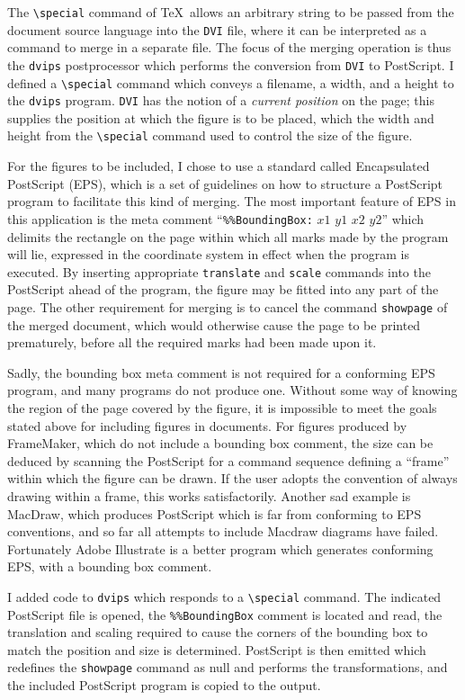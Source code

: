The \verb|\special| command of \TeX\
allows an arbitrary string to be passed from the
document source language into the {\tt DVI} file,
where it can be interpreted as a command to merge in a separate file.
The focus of the merging operation is thus the {\tt dvips} postprocessor
which performs the conversion from {\tt DVI} to PostScript.
I defined a \verb|\special| command
which conveys a filename, a width, and a height to the {\tt dvips}
program.
{\tt DVI} has the notion of a {\em current position}
on the page; this supplies the position at which the figure is to
be placed, which the width and height from the
\verb|\special|
command used to control the size of the figure.

For the figures to be included,
I chose to use a standard called Encapsulated PostScript (EPS),
which is a set of guidelines on how to structure a PostScript
program to facilitate this kind of merging.
The most important feature of EPS in this application
is the meta comment
``\verb|%%BoundingBox:| $x1$ $y1$ $x2$ $y2$''
which delimits the rectangle on the page within which all marks
made by the program will lie,
expressed in the coordinate system in effect when the program
is executed.
By inserting appropriate {\tt translate} and {\tt scale} commands
into the PostScript ahead of the program,
the figure may be fitted into any part of the page.
The other requirement for merging is to cancel the
command {\tt showpage} of the merged document,
which would otherwise cause the page to be printed
prematurely,
before all the required marks had been made upon it.

Sadly, the bounding box meta comment is not required for a conforming
EPS program, and many programs do not produce one.
Without some way of knowing the region of the page covered by
the figure, it is impossible to meet the goals stated above
for including figures in documents.
For figures produced by FrameMaker,
which do not include a bounding box comment,
the size can be deduced by scanning the PostScript
for a command sequence defining a ``frame'' within which the
figure can be drawn.
If the user adopts the convention of always drawing within a frame,
this works satisfactorily.
Another sad example is MacDraw,
which produces PostScript which is far from conforming to EPS conventions,
and so far all attempts to include Macdraw diagrams have failed.
Fortunately Adobe Illustrate is a better program which generates
conforming EPS, with a bounding box comment.

I added code to {\tt dvips} which responds to a
\verb|\special|
command.
The indicated PostScript file is opened,
the
\verb|%%BoundingBox|
comment is located and read,
the translation and scaling required to cause
the corners of the bounding box to match the position and size
is determined.
PostScript is then emitted which redefines the {\tt showpage}
command as null and performs the transformations,
and the included PostScript program is copied to the output.

